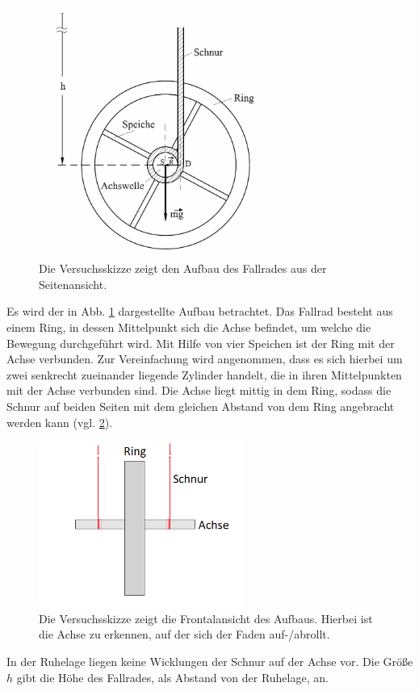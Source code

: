 \begin{figure}[ht]
	\centering
	\includegraphics[width=0.7\textwidth]{auswertung/fallrad_skizze.png}
	\caption{Die Versuchsskizze zeigt den Aufbau des Fallrades aus der Seitenansicht.}
	\label{fig:FallradSkizze}	
\end{figure}
Es wird der in Abb. \ref{fig:FallradSkizze} dargestellte Aufbau betrachtet. 
Das Fallrad besteht aus einem Ring, in dessen Mittelpunkt sich die Achse befindet, um welche die Bewegung durchgeführt wird. Mit Hilfe von vier Speichen ist der Ring mit der Achse verbunden. Zur Vereinfachung wird angenommen, dass es sich hierbei um zwei senkrecht zueinander liegende Zylinder handelt, die in ihren Mittelpunkten mit der Achse verbunden sind. 
Die Achse liegt mittig in dem Ring, sodass die Schnur auf beiden Seiten mit dem gleichen Abstand von dem Ring angebracht werden kann (vgl. \ref{fig:FallradFrontal}). 
\begin{figure}[ht]
	\centering
	\includegraphics[width=0.6\textwidth]{auswertung/fallrad_frontal.png}
	\caption{Die Versuchsskizze zeigt die Frontalansicht des Aufbaus. Hierbei ist die Achse zu erkennen, auf der sich der Faden auf-/abrollt.}
	\label{fig:FallradFrontal}	
\end{figure}
In der Ruhelage liegen keine Wicklungen der Schnur auf der Achse vor. Die Größe $h$ gibt die Höhe des Fallrades, als Abstand von der Ruhelage, an. 

